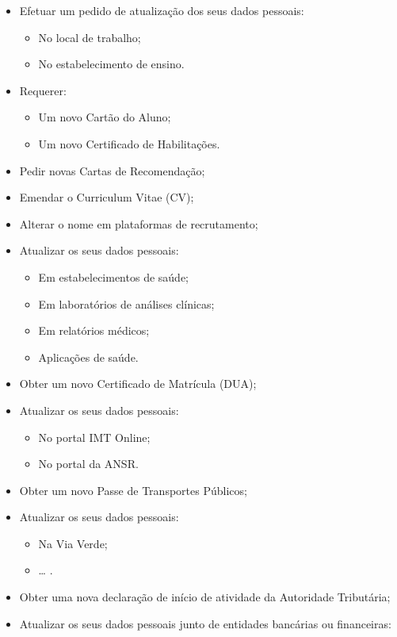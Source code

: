\begin{itemize}
	\item Efetuar um pedido de atualização dos seus dados pessoais:
	\begin{itemize}
		\item No local de trabalho;
		\item No estabelecimento de ensino.
	\end{itemize}
	\item Requerer:
	\begin{itemize}
		\item Um novo Cartão do Aluno;
		\item Um novo Certificado de Habilitações.
	\end{itemize}
	\item Pedir novas Cartas de Recomendação;
	\item Emendar o Curriculum Vitae (CV);
	\item Alterar o nome em plataformas de recrutamento;
	\item Atualizar os seus dados pessoais:
	\begin{itemize}
		\item Em estabelecimentos de saúde;
		\item Em laboratórios de análises clínicas;
		\item Em relatórios médicos;
		\item Aplicações de saúde.
	\end{itemize}
	\item Obter um novo Certificado de Matrícula (DUA);
	\item Atualizar os seus dados pessoais:
	\begin{itemize}
		\item No portal IMT Online;
		\item No portal da ANSR.
	\end{itemize}
	\item Obter um novo Passe de Transportes Públicos;
	\item Atualizar os seus dados pessoais:
	\begin{itemize}
		\item Na Via Verde;
		\item \ldots{} .
	\end{itemize}
	\item Obter uma nova declaração de início de atividade da Autoridade Tributária;
	\item Atualizar os seus dados pessoais junto de entidades bancárias ou financeiras:
	\begin{itemize}

\end{itemize}
\end{itemize}
